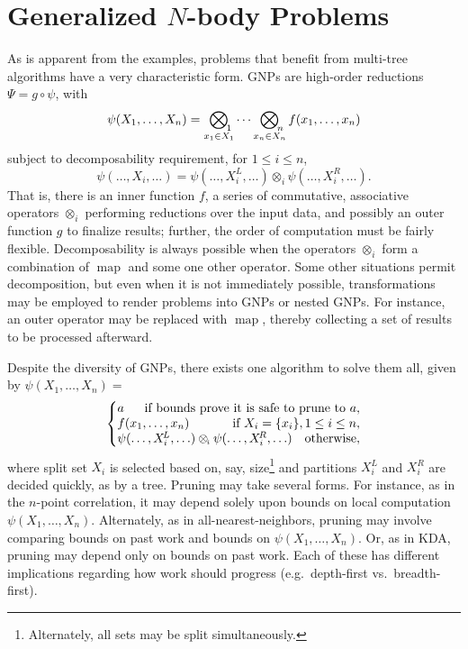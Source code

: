 \documentclass[twoside,leqno,twocolumn]{article}
\DeclareMathOperator*{\map}{map}
\newcommand{\comp}{\mathbin{\circ}}
\newcommand{\GenOp}[1]{\mathop{\bigotimes\nolimits_{\lefteqn{\scriptstyle \!#1}}}}
\newcommand{\genop}[1]{\mathbin{\otimes_{\scriptscriptstyle \!#1}}}
\newcommand{\Gnp}{\Psi}
\newcommand{\gnp}{\psi}
\newcommand{\kdleft}[1]{#1^{\!L}}
\newcommand{\kdright}[1]{#1^{\!R}}
\begin{document}
\section{Generalized $N$-body Problems}
As is apparent from the examples, problems that benefit from
multi-tree algorithms have a very characteristic form.  GNPs are
high-order reductions $\Gnp = g \comp \gnp$, with
\begin{equation}
  \gnp(X_1,\ldots,X_n) = \GenOp{1}_{x_1 \in X_1} \cdots \GenOp{n}_{x_n \in X_n} f(x_1,\ldots,x_n)
\end{equation}
subject to decomposability requirement, for $1 \leq i \leq n$,
\begin{equation}
  \gnp(\ldots,X_i,\ldots) = \gnp(\ldots,\kdleft{X_i},\ldots) \genop{i} \gnp(\ldots,\kdright{X_i},\ldots) .
\end{equation}
That is, there is an inner function $f$, a series of commutative,
associative operators $\genop{i}$ performing reductions over the input
data, and possibly an outer function $g$ to finalize results; further,
the order of computation must be fairly flexible.  Decomposability is
always possible when the operators $\genop{i}$ form a combination of
$\map$ and some one other operator.  Some other situations permit
decomposition, but even when it is not immediately possible,
transformations may be employed to render problems into GNPs or nested
GNPs.  For instance, an outer operator may be replaced with $\map$,
thereby collecting a set of results to be processed afterward.

Despite the diversity of GNPs, there exists one algorithm to solve
them all, given by $\gnp(X_1,\ldots,X_n) =$
\begin{equation}
  \left\{ \!\!\! \begin{array}{lrrr}
    a & \multicolumn{3}{r}{\text{if bounds prove it is safe to prune to $a$},} \\
    \multicolumn{2}{l}{f(x_1,\ldots,x_n)} & \multicolumn{2}{r}{\text{if } X_i = \{x_i\}, 1 \leq i \leq n,} \\
    \multicolumn{3}{l}{\gnp(\ldots,\kdleft{X_i},\ldots) \genop{i} \gnp(\ldots,\kdright{X_i},\ldots)} & \text{otherwise},
  \end{array} \!\!\! \right.
\end{equation}
where split set $X_i$ is selected based on, say,
size\footnote{Alternately, all sets may be split simultaneously.} and
partitions $\kdleft{X_i}$ and $\kdright{X_i}$ are decided quickly, as
by a tree.  Pruning may take several forms.  For instance, as in the
$n$-point correlation, it may depend solely upon bounds on local
computation $\psi(X_1,\ldots,X_n)$.  Alternately, as in
all-nearest-neighbors, pruning may involve comparing bounds on past
work and bounds on $\psi(X_1,\ldots,X_n)$.  Or, as in KDA, pruning may
depend only on bounds on past work.  Each of these has different
implications regarding how work should progress (e.g.~depth-first
vs.~breadth-first).
\end{document}
